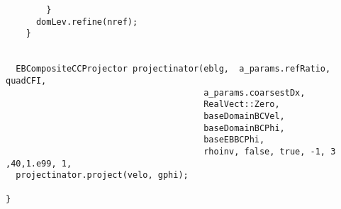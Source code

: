 \begin{small}
\begin{verbatim}
        }
      domLev.refine(nref);
    }

  
  EBCompositeCCProjector projectinator(eblg,  a_params.refRatio, quadCFI, 
                                       a_params.coarsestDx,
                                       RealVect::Zero,
                                       baseDomainBCVel,
                                       baseDomainBCPhi,
                                       baseEBBCPhi,
                                       rhoinv, false, true, -1, 3 ,40,1.e99, 1,
  projectinator.project(velo, gphi);

}
\end{verbatim}\end{small}



